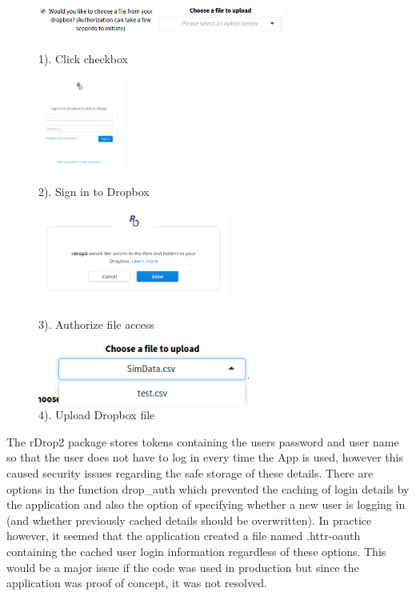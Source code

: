 \begin{figure}[h]
	\centering
	\begin{minipage}{.48\textwidth}
		\includegraphics[width=1\linewidth, height=1cm,left]{Images/RDropCheckbox.png}
		\caption{1). Click checkbox}
	\end{minipage} %
	\hfill
	\begin{minipage}{.4\textwidth}
		\includegraphics[width=0.9\linewidth, height=3cm,right]{Images/RDropLogin.png}
		\caption{2). Sign in to Dropbox}
	\end{minipage} %
	\newline
	\centering
	\begin{minipage}{.45\textwidth}
		\includegraphics[width=1\linewidth, height=3cm,left]{Images/RDropAuth.png}
		\caption{3). Authorize file access}
	\end{minipage} %
	\hfill
	\begin{minipage}{.45\textwidth}
		\includegraphics[width=1\linewidth, height=2cm,right]{Images/rdropDropDown.png}
		\caption{4). Upload Dropbox file}
	\end{minipage}
\end{figure}

\break\hfill

The rDrop2 package stores tokens containing the users password and user name so that the user does not have to log in every time the App is used, however this caused security issues regarding the safe storage of these details. There are options in the function drop\_auth which prevented the caching of login details by the application and also the option of specifying whether a new user is logging in (and whether previously cached details should be overwritten). In practice however, it seemed that the application created a file named .httr-oauth containing the cached user login information regardless of these options. This would be a major issue if the code was used in production but since the application was proof of concept, it was not resolved.

